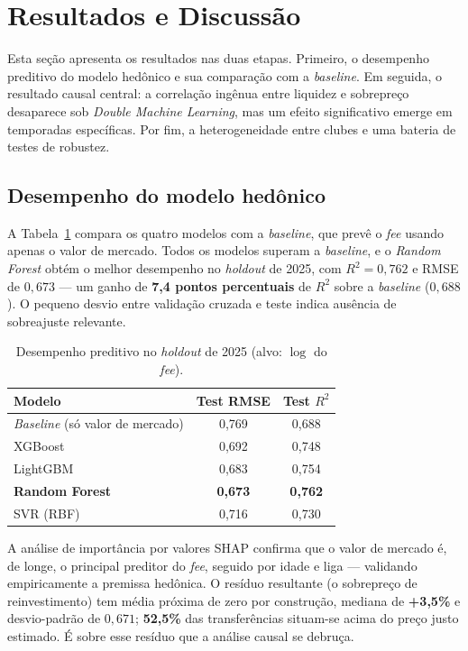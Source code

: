 \section{Resultados e Discussão}
\label{sec:resultados}

Esta seção apresenta os resultados nas duas etapas. Primeiro, o desempenho preditivo do modelo
hedônico e sua comparação com a \textit{baseline}. Em seguida, o resultado causal central: a
correlação ingênua entre liquidez e sobrepreço desaparece sob \textit{Double Machine Learning}, mas
um efeito significativo emerge em temporadas específicas. Por fim, a heterogeneidade entre clubes e
uma bateria de testes de robustez.

\subsection{Desempenho do modelo hedônico}

A Tabela~\ref{tab:hedonico} compara os quatro modelos com a \textit{baseline}, que prevê o
\textit{fee} usando apenas o valor de mercado. Todos os modelos superam a \textit{baseline}, e o
\textit{Random Forest} obtém o melhor desempenho no \textit{holdout} de 2025, com $R^2 = 0{,}762$ e
RMSE de $0{,}673$ — um ganho de \textbf{7,4 pontos percentuais} de $R^2$ sobre a \textit{baseline}
($0{,}688$). O pequeno desvio entre validação cruzada e teste indica ausência de sobreajuste
relevante.

\begin{table}[ht]
\centering
\caption{Desempenho preditivo no \textit{holdout} de 2025 (alvo: $\log$ do \textit{fee}).}
\label{tab:hedonico}
\begin{tabular}{lcc}
\toprule
\textbf{Modelo} & \textbf{Test RMSE} & \textbf{Test $R^2$} \\
\midrule
\textit{Baseline} (só valor de mercado) & 0,769 & 0,688 \\
XGBoost                                  & 0,692 & 0,748 \\
LightGBM                                 & 0,683 & 0,754 \\
\textbf{Random Forest}                   & \textbf{0,673} & \textbf{0,762} \\
SVR (RBF)                                & 0,716 & 0,730 \\
\bottomrule
\end{tabular}
\end{table}

A análise de importância por valores SHAP \cite{lundberg2017} confirma que o valor de mercado é, de
longe, o principal preditor do \textit{fee}, seguido por idade e liga — validando empiricamente a
premissa hedônica. O resíduo resultante (o sobrepreço de reinvestimento) tem média próxima de zero
por construção, mediana de \textbf{+3,5\%} e desvio-padrão de $0{,}671$; \textbf{52,5\%} das
transferências situam-se acima do preço justo estimado. É sobre esse resíduo que a análise causal se
debruça.


